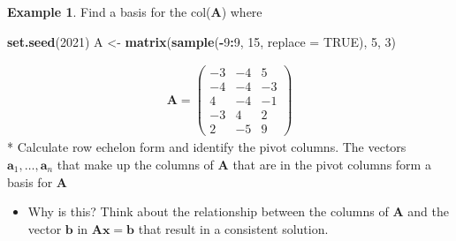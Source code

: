 \documentclass[
]{book}
\newenvironment{Shaded}{\begin{snugshade}}{\end{snugshade}}
\newcommand{\DataTypeTok}[1]{\textcolor[rgb]{0.13,0.29,0.53}{#1}}
\newcommand{\DecValTok}[1]{\textcolor[rgb]{0.00,0.00,0.81}{#1}}
\newcommand{\KeywordTok}[1]{\textcolor[rgb]{0.13,0.29,0.53}{\textbf{#1}}}
\newcommand{\NormalTok}[1]{#1}
\newcommand{\OperatorTok}[1]{\textcolor[rgb]{0.81,0.36,0.00}{\textbf{#1}}}
\newcommand{\OtherTok}[1]{\textcolor[rgb]{0.56,0.35,0.01}{#1}}
\newcommand{\StringTok}[1]{\textcolor[rgb]{0.31,0.60,0.02}{#1}}
\providecommand{\tightlist}{%
  \setlength{\itemsep}{0pt}\setlength{\parskip}{0pt}}
\theoremstyle{definition}
\theoremstyle{definition}
\newtheorem{example}{Example}[chapter]
\theoremstyle{definition}
\theoremstyle{definition}
\theoremstyle{remark}
\begin{document}
\begin{example}

Find a basis for the col(\(\mathbf{A}\)) where

\begin{Shaded}
\begin{Highlighting}[]
\KeywordTok{set.seed}\NormalTok{(}\DecValTok{2021}\NormalTok{)}
\NormalTok{A <-}\StringTok{ }\KeywordTok{matrix}\NormalTok{(}\KeywordTok{sample}\NormalTok{(}\OperatorTok{-}\DecValTok{9}\OperatorTok{:}\DecValTok{9}\NormalTok{, }\DecValTok{15}\NormalTok{, }\DataTypeTok{replace =} \OtherTok{TRUE}\NormalTok{), }\DecValTok{5}\NormalTok{, }\DecValTok{3}\NormalTok{)}
\end{Highlighting}
\end{Shaded}

\[
\begin{aligned}
\mathbf{A} = \begin{pmatrix} -3 & -4 & 5 \\ -4 & -4 & -3 \\ 4 & -4 & -1 \\ -3 & 4 & 2 \\ 2 & -5 & 9 \end{pmatrix}
\end{aligned}
\]
* Calculate row echelon form and identify the pivot columns. The vectors \(\mathbf{a}_1, \ldots, \mathbf{a}_n\) that make up the columns of \(\mathbf{A}\) that are in the pivot columns form a basis for \(\mathbf{A}\)

\begin{itemize}
\tightlist
\item
  Why is this? Think about the relationship between the columns of \(\mathbf{A}\) and the vector \(\mathbf{b}\) in \(\mathbf{A} \mathbf{x} = \mathbf{b}\) that result in a consistent solution.
\end{itemize}

\end{example}
\end{document}
